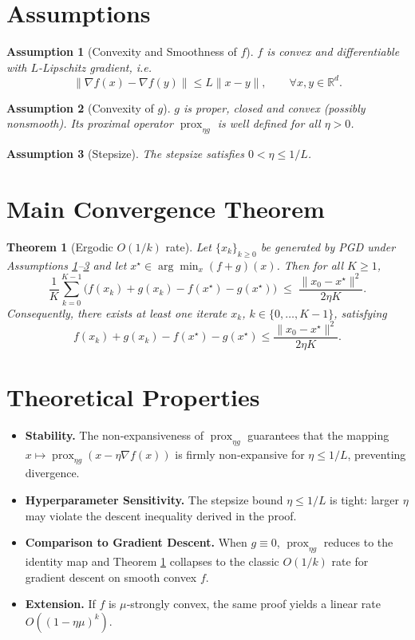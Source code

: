 \documentclass{article}
\newtheorem{theorem}{Theorem}
\newtheorem{assumption}{Assumption}
\newcommand{\prox}{\operatorname{prox}}
\newcommand{\R}{\mathbb{R}}
\begin{document}
\newpage
\section*{Assumptions}
\begin{assumption}[Convexity and Smoothness of $f$]\label{ass:convex-smooth}
$f$ is convex and differentiable with $L$-Lipschitz gradient, i.e.  
\[
\|\nabla f(x)-\nabla f(y)\|\le L\|x-y\|,\qquad\forall x,y\in\R^{d}.
\]
\end{assumption}
\begin{assumption}[Convexity of $g$]\label{ass:convex-g}
$g$ is proper, closed and convex (possibly nonsmooth). Its proximal operator $\prox_{\eta g}$ is well defined for all $\eta>0$.
\end{assumption}
\begin{assumption}[Stepsize]\label{ass:stepsize}
The stepsize satisfies $0<\eta\le 1/L$.
\end{assumption}

\section*{Main Convergence Theorem}
\begin{theorem}[Ergodic $O(1/k)$ rate]\label{thm:rate}
Let $\{x_{k}\}_{k\ge0}$ be generated by PGD under Assumptions \ref{ass:convex-smooth}–\ref{ass:stepsize} and let $x^{\star}\in\arg\min_{x}(f+g)(x)$. Then for all $K\ge1$,
\[
\frac{1}{K}\sum_{k=0}^{K-1}\bigl( f(x_{k})+g(x_{k})-f(x^{\star})-g(x^{\star})\bigr)
\;\le\;
\frac{\|x_{0}-x^{\star}\|^{2}}{2\eta K}.
\]
Consequently, there exists at least one iterate $x_{k}$, $k\in\{0,\dots,K-1\}$, satisfying  
\[
f(x_{k})+g(x_{k})-f(x^{\star})-g(x^{\star})\le \frac{\|x_{0}-x^{\star}\|^{2}}{2\eta K}.
\]
\end{theorem}

\section*{Theoretical Properties}
\begin{itemize}
\item \textbf{Stability.} The non‑expansiveness of $\prox_{\eta g}$ guarantees that the mapping $x\mapsto \prox_{\eta g}(x-\eta\nabla f(x))$ is firmly non‑expansive for $\eta\le 1/L$, preventing divergence.
\item \textbf{Hyperparameter Sensitivity.} The stepsize bound $\eta\le1/L$ is tight: larger $\eta$ may violate the descent inequality derived in the proof.
\item \textbf{Comparison to Gradient Descent.} When $g\equiv0$, $\prox_{\eta g}$ reduces to the identity map and Theorem \ref{thm:rate} collapses to the classic $O(1/k)$ rate for gradient descent on smooth convex $f$.
\item \textbf{Extension.} If $f$ is $\mu$‑strongly convex, the same proof yields a linear rate $O((1-\eta\mu)^{k})$.
\end{itemize}
\end{document}

